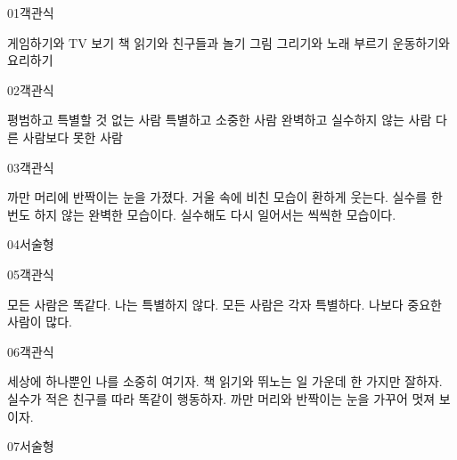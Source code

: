 \documentclass[fs13,seriesSau]{korfarm-base}
\begin{document}
\begin{kfQBlock}{01}{객관식}
\begin{kfChoices}
\kfChoice 게임하기와 TV 보기
\kfChoice 책 읽기와 친구들과 놀기
\kfChoice 그림 그리기와 노래 부르기
\kfChoice 운동하기와 요리하기
\end{kfChoices}
\end{kfQBlock}
\begin{kfQBlock}{02}{객관식}
\begin{kfChoices}
\kfChoice 평범하고 특별할 것 없는 사람
\kfChoice 특별하고 소중한 사람
\kfChoice 완벽하고 실수하지 않는 사람
\kfChoice 다른 사람보다 못한 사람
\end{kfChoices}
\end{kfQBlock}
\begin{kfQBlock}{03}{객관식}
\begin{kfChoices}
\kfChoice 까만 머리에 반짝이는 눈을 가졌다.
\kfChoice 거울 속에 비친 모습이 환하게 웃는다.
\kfChoice 실수를 한 번도 하지 않는 완벽한 모습이다.
\kfChoice 실수해도 다시 일어서는 씩씩한 모습이다.
\end{kfChoices}
\end{kfQBlock}
\begin{kfQBlock}{04}{서술형}
\end{kfQBlock}
\begin{kfQBlock}{05}{객관식}
\begin{kfChoices}
\kfChoice 모든 사람은 똑같다.
\kfChoice 나는 특별하지 않다.
\kfChoice 모든 사람은 각자 특별하다.
\kfChoice 나보다 중요한 사람이 많다.
\end{kfChoices}
\end{kfQBlock}
\begin{kfQBlock}{06}{객관식}
\begin{kfChoices}
\kfChoice 세상에 하나뿐인 나를 소중히 여기자.
\kfChoice 책 읽기와 뛰노는 일 가운데 한 가지만 잘하자.
\kfChoice 실수가 적은 친구를 따라 똑같이 행동하자.
\kfChoice 까만 머리와 반짝이는 눈을 가꾸어 멋져 보이자.
\end{kfChoices}
\end{kfQBlock}
\begin{kfQBlock}{07}{서술형}
\end{kfQBlock}
\end{document}
